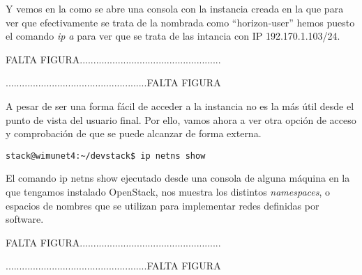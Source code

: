 Y vemos en la %
como se abre una consola con la instancia creada en la que para ver que efectivamente se trata de la nombrada como “horizon-user” hemos puesto el comando \textit{ip a} para ver que se trata de las intancia con IP 192.170.1.103/24.

\begin{tcolorbox}[colback=green!5!white,colframe=green!75!black]
FALTA FIGURA....................................................

....................................................FALTA FIGURA
\end{tcolorbox}


\begin{comment}
\begin{figure}
    \centering
    \texttt{[image: imagenes/capitulo8/consolaInstanciaHorizon.PNG]}
    \caption{Consola de la instancia de cirros horizon-instance-1.}
	\vspace{0.3cm}
    \label{consolaInstanciaHorizon}
\end{figure}
\end{comment}

A pesar de ser una forma fácil de acceder a la instancia no es la más útil desde el punto de vista del usuario final. Por ello, vamos ahora a ver otra opción de acceso y comprobación de que se puede alcanzar de forma externa.

\begin{lstlisting}[style=Consola]
stack@wimunet4:~/devstack$ ip netns show
\end{lstlisting}

El comando ip netns show ejecutado desde una consola de alguna máquina en la que tengamos instalado OpenStack, nos muestra los distintos \textit{namespaces}, o espacios de nombres que se utilizan para implementar redes definidas por software.

\begin{tcolorbox}[colback=green!5!white,colframe=green!75!black]
FALTA FIGURA....................................................

....................................................FALTA FIGURA
\end{tcolorbox}


\begin{comment}
\begin{figure}
    \centering
    \texttt{[image: imagenes/capitulo8/ipnetnsshow.PNG]}
    \caption{Openstack namespaces.}
	\vspace{0.3cm}
    \label{ipnetnsshow}
\end{figure}
\end{comment}


